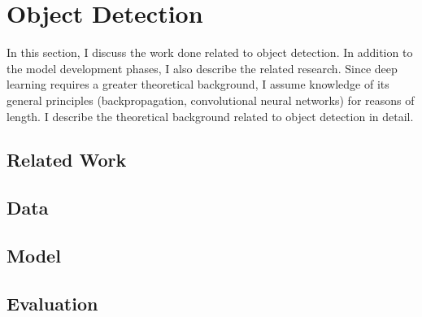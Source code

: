 \chapter{Object Detection}

In this section, I discuss the work done related to object detection. In addition to the model development phases, I also describe the related research. Since deep learning requires a greater theoretical background, I assume knowledge of its general principles (backpropagation, convolutional neural networks) for reasons of length. I describe the theoretical background related to object detection in detail.

\section{Related Work}

\section{Data}

\section{Model}

\section{Evaluation}